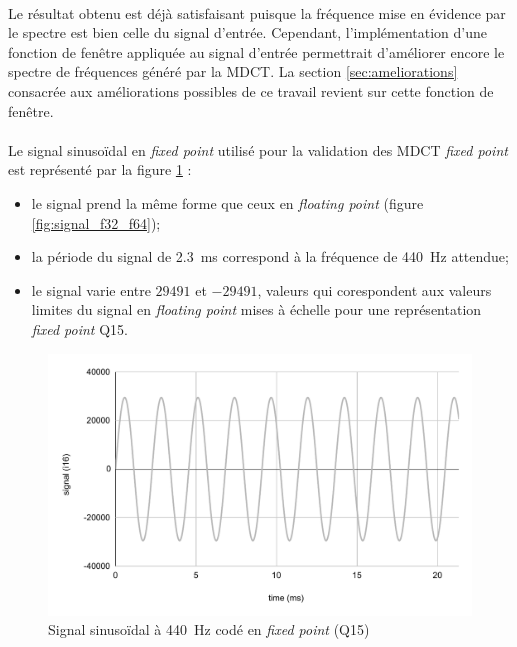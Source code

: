 \documentclass{article}
\begin{document}
    \paragraph{}
    Le résultat obtenu est déjà satisfaisant puisque la fréquence mise en évidence par le spectre est bien celle du signal d'entrée. Cependant, l'implémentation d'une fonction de fenêtre appliquée au signal d'entrée permettrait d'améliorer encore le spectre de fréquences généré par la MDCT. La section \ref{sec:ameliorations} consacrée aux améliorations possibles de ce travail revient sur cette fonction de fenêtre.

    \paragraph{}
    Le signal sinusoïdal en \emph{fixed point} utilisé pour la validation des MDCT \emph{fixed point} est représenté par la figure \ref{fig:signal_i16} :
    \begin{itemize}
        \item le signal prend la même forme que ceux en \emph{floating point} (figure \ref{fig:signal_f32_f64});
        \item la période du signal de \SI{2.3}{\milli\second} correspond à la fréquence de \SI{440}{\hertz} attendue;
        \item le signal varie entre $29491$ et $-29491$, valeurs qui corespondent aux valeurs limites du signal en \emph{floating point} mises à échelle pour une représentation \emph{fixed point} Q15.
    \end{itemize}

    \begin{figure}[H]
        \centering
        \includegraphics[width=.8\linewidth]{./images/signal_i16.pdf}
        \caption{Signal sinusoïdal à \SI{440}{\hertz} codé en \emph{fixed point} (Q15)}
        \label{fig:signal_i16}
    \end{figure}
\end{document}
